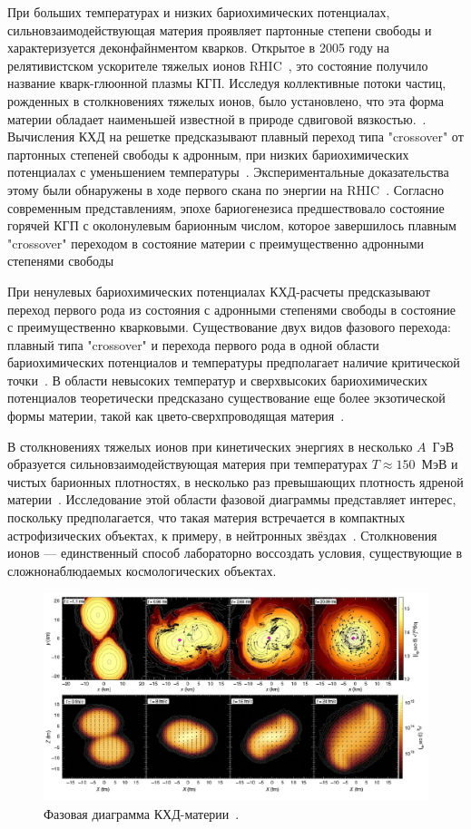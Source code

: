 При больших температурах и низких бариохимических потенциалах, сильновзаимодействующая материя проявляет партонные степени свободы и характеризуется деконфайнментом кварков. 
Открытое в 2005 году на релятивистском ускорителе тяжелых ионов RHIC~\cite{STAR:2005gfr}, это состояние получило название кварк-глюонной плазмы КГП.
Исследуя коллективные потоки частиц, рожденных в столкновениях тяжелых ионов, было установлено, что эта форма материи обладает наименьшей известной в природе сдвиговой вязкостью.~\cite{Shen:2015msa}.
Вычисления КХД на решетке предсказывают плавный переход типа "crossover" от партонных степеней свободы к адронным, при низких бариохимических потенциалах с уменьшением температуры~\cite{HotQCD:2014kol, Karsch:2003va}.
Экспериментальные доказательства этому были обнаружены в ходе первого скана по энергии на RHIC~\cite{Odyniec:2019kfh}.
Согласно современным представлениям, эпохе бариогенезиса предшествовало состояние горячей КГП с околонулевым барионным числом, которое завершилось плавным "crossover" переходом в состояние материи с преимущественно адронными степенями свободы~\cite{Esumi:2022uas}

При ненулевых бариохимических потенциалах КХД-расчеты предсказывают переход первого рода из состояния с адронными степенями свободы в состояние с преимущественно кварковыми.
Существование двух видов фазового перехода: плавный типа "crossover" и перехода первого рода в одной области бариохимических потенциалов и температуры предполагает наличие критической точки~\cite{Odyniec:2019kfh}.
В области невысоких температур и сверхвысоких бариохимических потенциалов теоретически предсказано существование еще более экзотической формы материи, такой как цвето-сверхпроводящая материя~\cite{McLerran:2008ux}.

В столкновениях тяжелых ионов при кинетических энергиях в несколько $A$~ГэВ образуется сильновзаимодействующая материя при температурах $T\approx150$~МэВ и чистых барионных плотностях, в несколько раз превышающих плотность ядреной материи~\cite{Adamczewski-Musch:2019byl}.
Исследование этой области фазовой диаграммы представляет интерес, поскольку предполагается, что такая материя встречается в компактных астрофизических объектах, к примеру, в нейтронных звёздах~\cite{Danielewicz:2002pu}.
Столкновения ионов --- единственный способ лабораторно воссоздать условия, существующие в сложнонаблюдаемых космологических объектах.

%
\begin{figure}[h]
    \centering
    \includegraphics[width=0.5\linewidth]{images/neutronmerg.png}
    \caption{Фазовая диаграмма КХД-материи~\cite{Bzdak:2019pkr}.}
    \label{fig:neutronmerg}
\end{figure}

